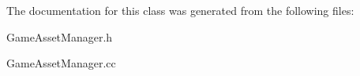The documentation for this class was generated from the following files\-:\begin{DoxyCompactItemize}
\item 
Game\-Asset\-Manager.\-h\item 
Game\-Asset\-Manager.\-cc\end{DoxyCompactItemize}

